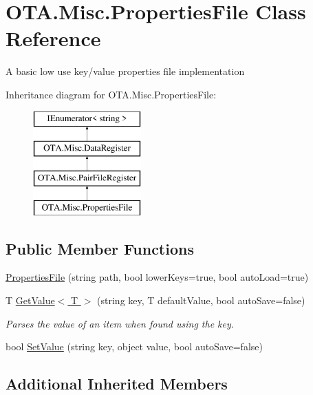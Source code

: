\hypertarget{class_o_t_a_1_1_misc_1_1_properties_file}{}\section{O\+T\+A.\+Misc.\+Properties\+File Class Reference}
\label{class_o_t_a_1_1_misc_1_1_properties_file}


A basic low use key/value properties file implementation  


Inheritance diagram for O\+T\+A.\+Misc.\+Properties\+File\+:\begin{figure}[H]
\begin{center}
\leavevmode
\includegraphics[height=4.000000cm]{class_o_t_a_1_1_misc_1_1_properties_file}
\end{center}
\end{figure}
\subsection*{Public Member Functions}
\begin{DoxyCompactItemize}
\item 
\hyperlink{class_o_t_a_1_1_misc_1_1_properties_file_aab6bb283acf537fa627f35cffe589b87}{Properties\+File} (string path, bool lower\+Keys=true, bool auto\+Load=true)
\item 
T \hyperlink{class_o_t_a_1_1_misc_1_1_properties_file_a2fdb2d1fb1389af160cdba8ed080eb0b}{Get\+Value$<$ T $>$} (string key, T default\+Value, bool auto\+Save=false)
\begin{DoxyCompactList}\small\item\em Parses the value of an item when found using the key. \end{DoxyCompactList}\item 
bool \hyperlink{class_o_t_a_1_1_misc_1_1_properties_file_aef177d4cdd2b67c3f370af541480ab91}{Set\+Value} (string key, object value, bool auto\+Save=false)
\end{DoxyCompactItemize}
\subsection*{Additional Inherited Members}


